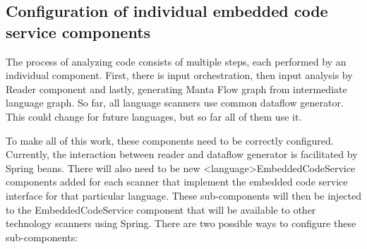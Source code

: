 \subsection{Configuration of individual embedded code service components}
The process of analyzing code consists of multiple steps, each performed by an individual component. First, there is input orchestration, then input analysis by Reader component and lastly, generating Manta Flow graph from intermediate language graph. So far, all language scanners use common dataflow generator. This could change for future languages, but so far all of them use it.
\par
To make all of this work, these components need to be correctly configured. Currently, the interaction between reader and dataflow generator is facilitated by Spring beans. There will also need to be new <language>EmbeddedCodeService components added for each scanner that implement the embedded code service interface for that particular language. These sub-components will then be injected to the EmbeddedCodeService component that will be available to other technology scanners using Spring. There are two possible ways to configure these sub-components:
